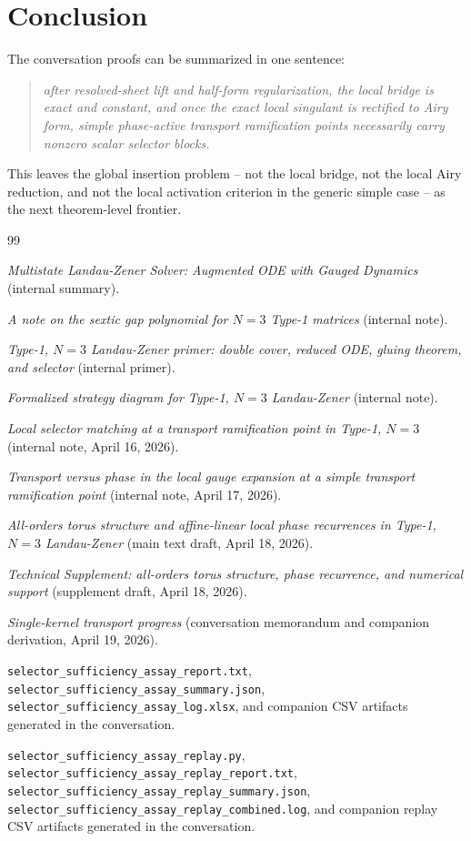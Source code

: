 \documentclass[11pt]{article}
\numberwithin{equation}{section}
\theoremstyle{definition}
\begin{document}
\section{Conclusion}

The conversation proofs can be summarized in one sentence:
\begin{quote}\itshape
after resolved-sheet lift and half-form regularization, the local bridge is exact and constant, and once the exact local singulant is rectified to Airy form, simple phase-active transport ramification points necessarily carry nonzero scalar selector blocks.
\end{quote}

This leaves the global insertion problem -- not the local bridge, not the local Airy reduction, and not the local activation criterion in the generic simple case -- as the next theorem-level frontier.

\begin{thebibliography}{99}

\emph{Multistate Landau-Zener Solver: Augmented ODE with Gauged Dynamics} (internal summary).

\emph{A note on the sextic gap polynomial for $N=3$ Type-1 matrices} (internal note).

\emph{Type-1, $N=3$ Landau-Zener primer: double cover, reduced ODE, gluing theorem, and selector} (internal primer).

\emph{Formalized strategy diagram for Type-1, $N=3$ Landau-Zener} (internal note).

\emph{Local selector matching at a transport ramification point in Type-1, $N=3$} (internal note, April 16, 2026).

\emph{Transport versus phase in the local gauge expansion at a simple transport ramification point} (internal note, April 17, 2026).

\emph{All-orders torus structure and affine-linear local phase recurrences in Type-1, $N=3$ Landau-Zener} (main text draft, April 18, 2026).

\emph{Technical Supplement: all-orders torus structure, phase recurrence, and numerical support} (supplement draft, April 18, 2026).

\emph{Single-kernel transport progress} (conversation memorandum and companion derivation, April 19, 2026).

\texttt{selector\_sufficiency\_assay\_report.txt}, \texttt{selector\_sufficiency\_assay\_summary.json}, \texttt{selector\_sufficiency\_assay\_log.xlsx}, and companion CSV artifacts generated in the conversation.

\texttt{selector\_sufficiency\_assay\_replay.py}, \texttt{selector\_sufficiency\_assay\_replay\_report.txt}, \texttt{selector\_sufficiency\_assay\_replay\_summary.json}, \texttt{selector\_sufficiency\_assay\_replay\_combined.log}, and companion replay CSV artifacts generated in the conversation.

\end{thebibliography}
\end{document}
